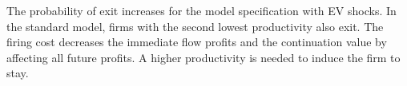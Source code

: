 \documentclass[10pt]{article}
\begin{document}
The probability of exit increases for the model specification with EV shocks. In the standard model, firms with the second lowest productivity also exit. The firing cost decreases the immediate flow profits and the continuation value 
by affecting all future profits. A higher productivity is needed to induce the firm to stay. 
\end{document}
